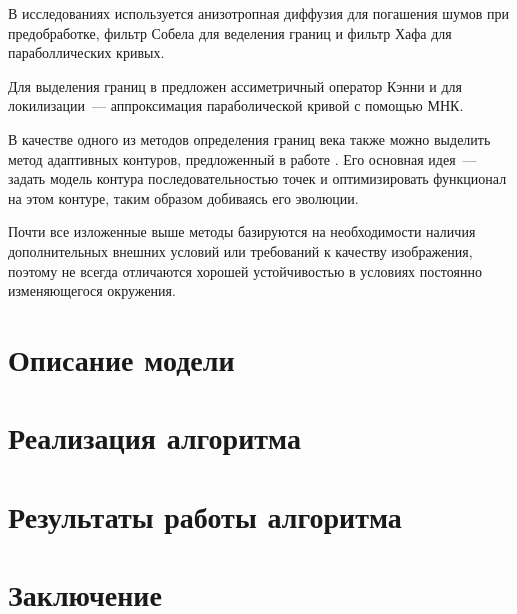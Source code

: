 \documentclass[12pt]{article} %
\begin{document}
В исследованиях \cite{Adam_2, Adam_1} используется анизотропная диффузия для погашения шумов при предобработке, фильтр Собела для веделения границ и фильтр Хафа для параболлических кривых. 

Для выделения границ в \cite{Yang} предложен ассиметричный оператор Кэнни и для локилизации~--- аппроксимация параболической кривой с помощью МНК. 

В качестве одного из методов определения границ века также можно выделить метод адаптивных контуров, предложенный в работе \cite{Smirn}. Его основная идея~--- задать модель контура последовательностью точек и оптимизировать функционал на этом контуре, таким образом добиваясь его эволюции.

Почти все изложенные выше методы базируются на необходимости наличия дополнительных внешних условий или требований к качеству изображения, поэтому не всегда отличаются хорошей устойчивостью в условиях постоянно изменяющегося окружения. 


\newpage
\section{Описание модели}




\newpage
\section{Реализация алгоритма}




\newpage
\section{Результаты работы алгоритма}





\newpage
\section{Заключение}




\newpage



\nocite{Yang}
\end{document}
